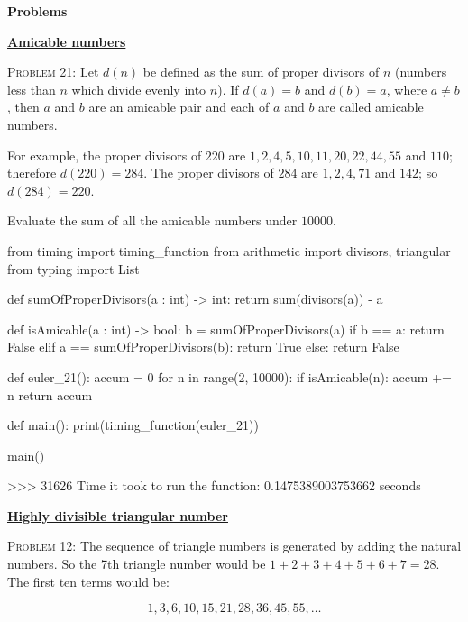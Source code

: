 \documentclass[11pt]{article}
\begin{document}
\vspace{3em}
\begin{center}
{\bf  Problems}\\ 
\end{center}
\noindent
\href{https://projecteuler.net/problem=1}{\textbf{Amicable numbers}}\par\noindent
\textsc{Problem 21:} Let $d(n)$ be defined as the sum of proper divisors of $n$ (numbers less than $n$ which divide evenly into $n$).
If $d(a) = b$ and $d(b) = a$, where $a \ne b$, then $a$ and $b$ are an amicable pair and each of $a$ and $b$ are called amicable numbers.
\par
For example, the proper divisors of $220$ are $1, 2, 4, 5, 10, 11, 20, 22, 44, 55$ and $110$; therefore $d(220) = 284$. 
The proper divisors of $284$ are $1, 2, 4, 71$ and $142$; so $d(284) = 220$.
\par
Evaluate the sum of all the amicable numbers under $10000$.
\begin{code}
from timing import timing_function
from arithmetic import divisors, triangular
from typing import List

def sumOfProperDivisors(a : int) -> int:
    return sum(divisors(a)) - a

def isAmicable(a : int) -> bool:
    b = sumOfProperDivisors(a)
    if b == a:
        return False
    elif a == sumOfProperDivisors(b):
        return True
    else:
        return False

def euler_21():
    accum = 0
    for n in range(2, 10000):
        if isAmicable(n):
            accum += n
    return accum


def main():
    print(timing_function(euler_21))

main()
\end{code}
\begin{shell}
>>> 31626
Time it took to run the function: 0.1475389003753662 seconds
\end{shell}

\par\bigskip\noindent
\href{https://projecteuler.net/problem=12}{\textbf{Highly divisible triangular number}}\par\noindent
\textsc{Problem 12:}
The sequence of triangle numbers is generated by adding the natural numbers. So the 7\textrm{th} triangle number would be $1 + 2 + 3 + 4 + 5 + 6 + 7 = 28$. The first ten terms would be:

\begin{equation*}
1, 3, 6, 10, 15, 21, 28, 36, 45, 55, \dotsc  
\end{equation*}
\end{document}

